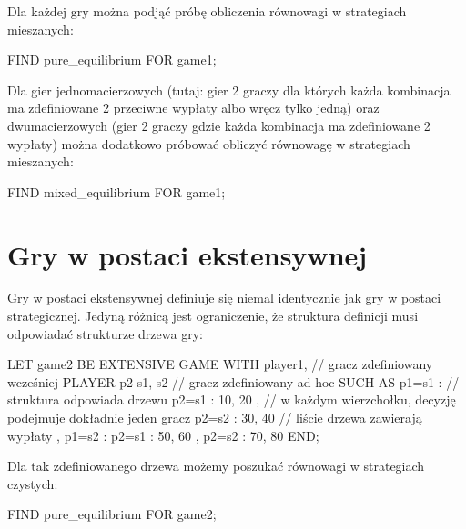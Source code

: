 \documentclass{standalone}
\begin{document}
Dla każdej gry można podjąć próbę obliczenia równowagi w strategiach mieszanych:

\begin{code}
FIND pure_equilibrium FOR game1;
\end{code}

Dla gier jednomacierzowych (tutaj: gier 2 graczy dla których każda kombinacja ma zdefiniowane 2 przeciwne wypłaty albo wręcz tylko jedną) oraz
dwumacierzowych (gier 2 graczy gdzie każda kombinacja ma zdefiniowane 2 wypłaty) można dodatkowo próbować obliczyć równowagę w strategiach mieszanych:

\begin{code}
FIND mixed_equilibrium FOR game1;
\end{code}

\section{Gry w postaci ekstensywnej}

Gry w postaci ekstensywnej definiuje się niemal identycznie jak gry w postaci strategicznej. Jedyną różnicą jest ograniczenie, że struktura definicji musi odpowiadać strukturze drzewa gry:

\begin{code}
LET game2 BE
  EXTENSIVE GAME
  WITH
    player1, // gracz zdefiniowany wcześniej
    PLAYER p2 { s1, s2 } // gracz zdefiniowany ad hoc
  SUCH AS
    { p1=s1 :             // struktura odpowiada drzewu
      { p2=s1 : 10, 20 }, // w każdym wierzchołku, decyzję podejmuje dokładnie jeden gracz
      { p2=s2 : 30, 40 }  // liście drzewa zawierają wypłaty
    },
    { p1=s2 :
      { p2=s1 : 50, 60 },
      { p2=s2 : 70, 80 }
    }
  END;
\end{code}

Dla tak zdefiniowanego drzewa możemy poszukać równowagi w strategiach czystych:

\begin{code}
FIND pure_equilibrium FOR game2;
\end{code}
\end{document}
